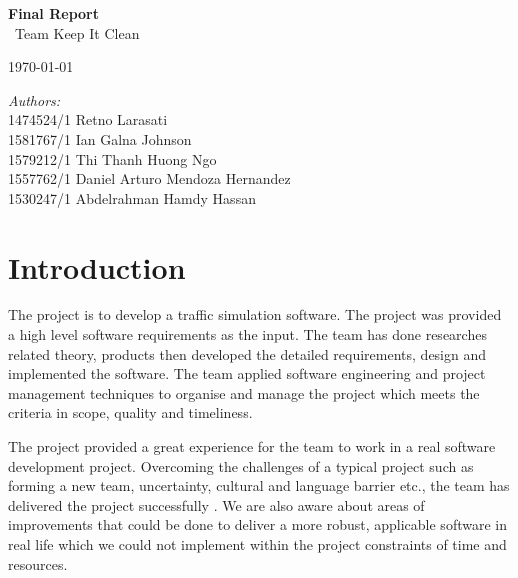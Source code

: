 \documentclass[11pt]{article}
\begin{document}
	\begin{titlepage}
	\center
	\newcommand{\HRule}{\rule{\linewidth}{0.5mm}} 

        {\huge \bfseries Final Report}\\[0.4cm]
        	\ Team Keep It Clean
        
        {\large \today}\\[10cm] 
        
        \begin{minipage}{0.4\textwidth}
        		\emph{Authors:}\\
        			1474524/1	Retno Larasati\\
                    1581767/1	Ian Galna Johnson\\	
                    1579212/1	Thi Thanh Huong Ngo\\
                    1557762/1	Daniel Arturo Mendoza Hernandez\\
                    1530247/1	Abdelrahman Hamdy Hassan\\
        \end{minipage}

\end{titlepage}
\tableofcontents
\newpage
	
\section{Introduction}
The project is to develop a traffic simulation software.  The project was provided  a high level software requirements as the input. The team has done researches related theory, products then developed the detailed requirements, design and implemented the software. The team applied software engineering and project management techniques to organise and manage the project which meets the criteria in scope, quality and timeliness. 

The project provided a great experience for the team to work in a real software development project. Overcoming the challenges of a typical project such as forming a new team, uncertainty, cultural and language barrier etc., the team has delivered the project successfully . We are also aware about areas of improvements that could be done to deliver a more robust, applicable software in real life which we could not implement within  the project constraints of time and resources.
\end{document}
